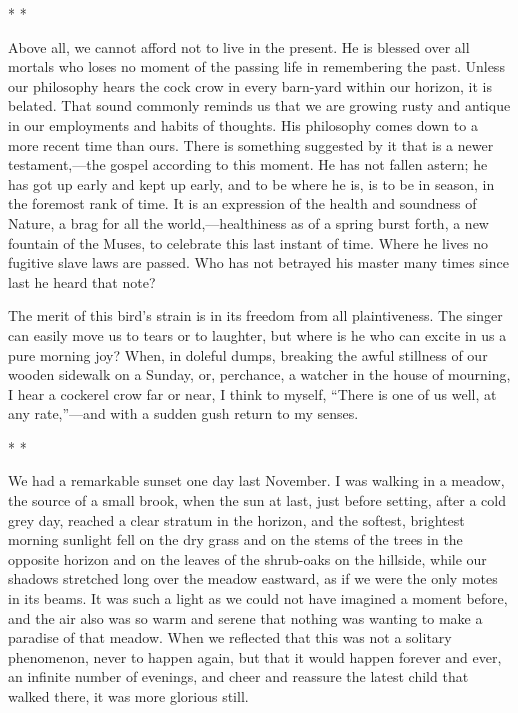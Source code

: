 \documentclass[twoside,openright,10pt]{memoir} %
\begin{document}
\begin{center}\tiny * * * \normalsize \end{center}
Above all, we cannot afford not to live in the present. He is blessed over all mortals who loses no moment of the passing life in remembering the past. Unless our philosophy hears the cock crow in every barn-yard within our horizon, it is belated. That sound commonly reminds us that we are growing rusty and antique in our employments and habits of thoughts. His philosophy comes down to a more recent time than ours. There is something suggested by it that is a newer testament,—the gospel according to this moment. He has not fallen astern; he has got up early and kept up early, and to be where he is, is to be in season, in the foremost rank of time. It is an expression of the health and soundness of Nature, a brag for all the world,—healthiness as of a spring burst forth, a new fountain of the Muses, to celebrate this last instant of time. Where he lives no fugitive slave laws are passed. Who has not betrayed his master many times since last he heard that note?

The merit of this bird’s strain is in its freedom from all plaintiveness. The singer can easily move us to tears or to laughter, but where is he who can excite in us a pure morning joy? When, in doleful dumps, breaking the awful stillness of our wooden sidewalk on a Sunday, or, perchance, a watcher in the house of mourning, I hear a cockerel crow far or near, I think to myself, “There is one of us well, at any rate,”—and with a sudden gush return to my senses.
\begin{center}\tiny * * * \normalsize \end{center}
We had a remarkable sunset one day last November. I was walking in a meadow, the source of a small brook, when the sun at last, just before setting, after a cold grey day, reached a clear stratum in the horizon, and the softest, brightest morning sunlight fell on the dry grass and on the stems of the trees in the opposite horizon and on the leaves of the shrub-oaks on the hillside, while our shadows stretched long over the meadow eastward, as if we were the only motes in its beams. It was such a light as we could not have imagined a moment before, and the air also was so warm and serene that nothing was wanting to make a paradise of that meadow. When we reflected that this was not a solitary phenomenon, never to happen again, but that it would happen forever and ever, an infinite number of evenings, and cheer and reassure the latest child that walked there, it was more glorious still.
\end{document}
